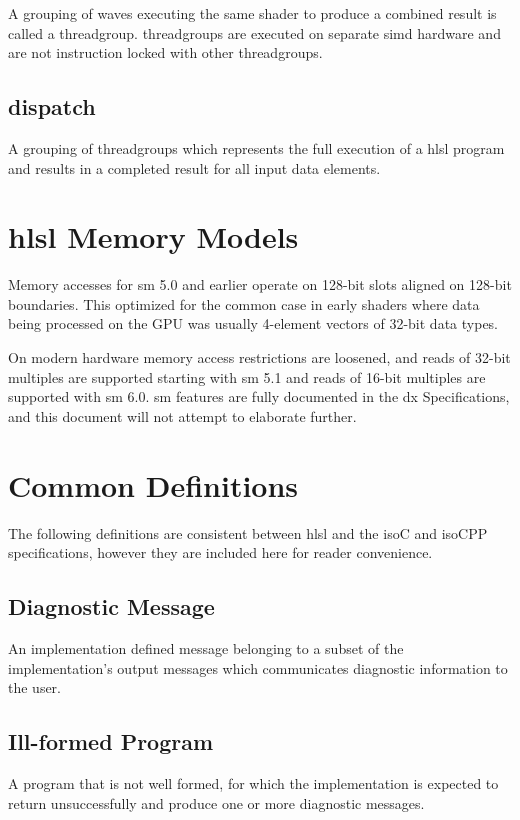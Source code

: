 \p A grouping of \gls{wave}s executing the same shader to produce a combined
result is called a \gls{threadgroup}. \gls{threadgroup}s are executed on
separate \acrshort{simd} hardware and are not instruction locked with other
\gls{threadgroup}s.

\subsection{\gls{dispatch}} \label{subsection:Dispatch}

\p A grouping of \gls{threadgroup}s which represents the full execution of a
\acrshort{hlsl} program and results in a completed result for all input data
elements.

\section{\acrshort{hlsl} Memory Models} \label{sec:Memory}

\p Memory accesses for \gls{sm} 5.0 and earlier operate on 128-bit slots aligned
on 128-bit boundaries. This optimized for the common case in early shaders where
data being processed on the GPU was usually 4-element vectors of 32-bit data
types.

\p On modern hardware memory access restrictions are loosened, and reads of
32-bit multiples are supported starting with \gls{sm} 5.1 and reads of 16-bit
multiples are supported with \gls{sm} 6.0. \gls{sm} features are fully
documented in the \gls{dx} Specifications, and this document will not attempt to
elaborate further.

\section{Common Definitions} \label{sec:Definitions}

\p The following definitions are consistent between \acrshort{hlsl} and the
\gls{isoC} and \gls{isoCPP} specifications, however they are included here for
reader convenience.

\subsection{Diagnostic Message}
\p An implementation defined message belonging to a subset of the
implementation's output messages which communicates diagnostic information to
the user.

\subsection{Ill-formed Program}
\p A program that is not well formed, for which the implementation is expected
to return unsuccessfully and produce one or more diagnostic messages.

